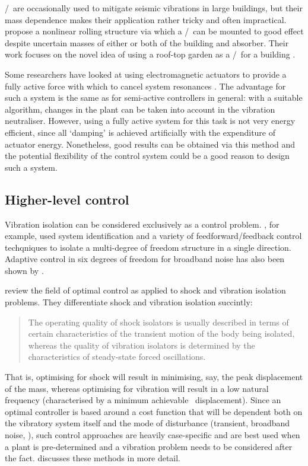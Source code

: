 \Vibneut/\ are occasionally used to mitigate seismic vibrations
in large buildings, but their mass dependence makes their application rather
tricky and often impractical.
\textcite{matta2008} propose a nonlinear
rolling structure via which a \vibneut/\ can be mounted to good effect
despite uncertain masses of either or both of the building and absorber.
Their
work focuses on the novel idea of using a roof-top garden as a \vibneut/\ for
a building \cite{matta2008a}.

Some researchers have looked at using electromagnetic actuators to provide a fully active force with which to cancel system resonances \cite{chen2005a,wu2007,kim2008a}.
The advantage for such a system is the same as for semi-active controllers in general: with a suitable algorithm, changes in the plant can be taken into account in the vibration neutraliser.
However, using a fully active system for this task is not very energy efficient, since
all `damping' is achieved artificially with the expenditure of actuator
energy.
Nonetheless, good results can be obtained via this method and the
potential flexibility of the control system could be a good reason to design
such a system.

\subsection{Higher-level control}

Vibration isolation can be considered exclusively as a control problem. 
\textcite{guo2005}, for example, used system identification and a variety of feedforward/feedback control techqniques to isolate a multi-degree of freedom structure in a single direction.
Adaptive control in six degrees of freedom for broadband noise has also been shown by \textcite{duindam2005}.

\textcite{balandin1998} review the field of optimal control as applied
to shock and vibration isolation problems.
They differentiate shock and vibration isolation succintly:
\begin{quote}
  The operating quality of shock isolators is usually described in
  terms of certain characteristics of the transient motion of the body
  being isolated, whereas the quality of vibration isolators is
  determined by the characteristics of steady-state forced
  oscillations.
\end{quote}
That is, optimising for shock will result in minimising, say, the peak displacement of the mass, whereas optimising for vibration will result in a low natural frequency (characterised by a minimum achievable \RMS\ displacement).
Since an optimal controller is based around a cost function that will be dependent both on the vibratory system itself and the mode of disturbance (transient, broadband noise, \etc), such control approaches are heavily case-specific and are best used when a plant is pre-determined and a vibration problem needs to be considered after the fact.
\textcite{bolotnik2001} discusses these methods in more detail.

